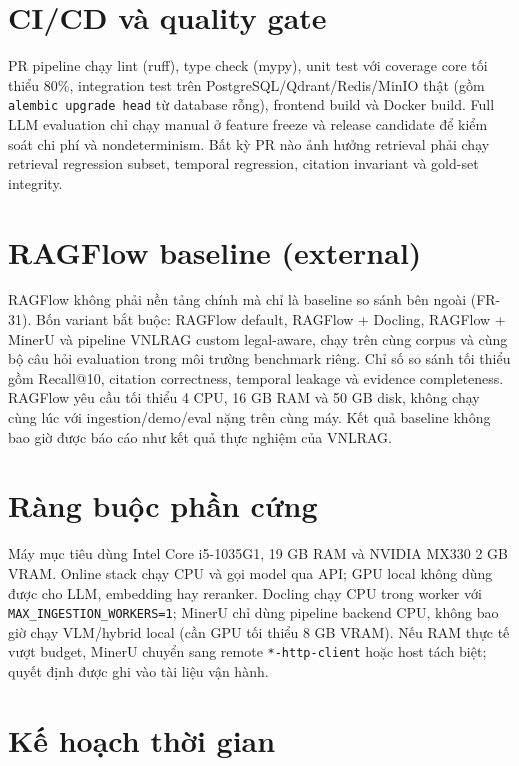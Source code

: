 \documentclass[a4paper,12pt]{extreport}
\newcommand{\code}[1]{\texttt{#1}}
\begin{document}
\section{CI/CD và quality gate}

PR pipeline chạy lint (ruff), type check (mypy), unit test với coverage core tối thiểu 80\%, integration test trên PostgreSQL/Qdrant/Redis/MinIO thật (gồm \code{alembic upgrade head} từ database rỗng), frontend build và Docker build. Full LLM evaluation chỉ chạy manual ở feature freeze và release candidate để kiểm soát chi phí và nondeterminism. Bất kỳ PR nào ảnh hưởng retrieval phải chạy retrieval regression subset, temporal regression, citation invariant và gold-set integrity.

\section{RAGFlow baseline (external)}

RAGFlow không phải nền tảng chính mà chỉ là baseline so sánh bên ngoài (FR-31). Bốn variant bắt buộc: RAGFlow default, RAGFlow + Docling, RAGFlow + MinerU và pipeline VNLRAG custom legal-aware, chạy trên cùng corpus và cùng bộ câu hỏi evaluation trong môi trường benchmark riêng. Chỉ số so sánh tối thiểu gồm Recall@10, citation correctness, temporal leakage và evidence completeness. RAGFlow yêu cầu tối thiểu 4 CPU, 16 GB RAM và 50 GB disk, không chạy cùng lúc với ingestion/demo/eval nặng trên cùng máy. Kết quả baseline không bao giờ được báo cáo như kết quả thực nghiệm của VNLRAG.

\section{Ràng buộc phần cứng}

Máy mục tiêu dùng Intel Core i5-1035G1, 19 GB RAM và NVIDIA MX330 2 GB VRAM. Online stack chạy CPU và gọi model qua API; GPU local không dùng được cho LLM, embedding hay reranker. Docling chạy CPU trong worker với \code{MAX\_INGESTION\_WORKERS=1}; MinerU chỉ dùng pipeline backend CPU, không bao giờ chạy VLM/hybrid local (cần GPU tối thiểu 8 GB VRAM). Nếu RAM thực tế vượt budget, MinerU chuyển sang remote \code{*-http-client} hoặc host tách biệt; quyết định được ghi vào tài liệu vận hành.

\section{Kế hoạch thời gian}
\end{document}
